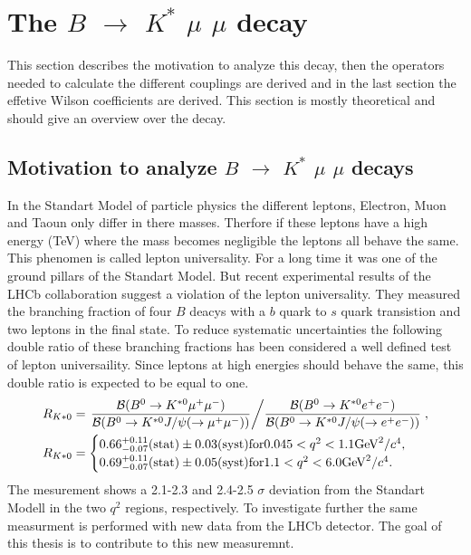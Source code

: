 \documentclass[english]{uzhpub}
\begin{document}
 \section{The $B$ $\rightarrow$ $K^{*}$ $\mu$ $\mu$ decay}

This section describes the motivation to analyze this decay, then the operators needed to calculate the different couplings are derived and in the last section the effetive Wilson coefficients are derived. This section is mostly theoretical and should give an overview over the decay.

 \subsection{Motivation to analyze $B$ $\rightarrow$ $K^{*}$ $\mu$ $\mu$ decays} \label{sec:Motivation}

 In the Standart Model of particle physics the different leptons, Electron, Muon and Taoun only differ in there masses. Therfore if these leptons have a high energy (TeV) where the mass becomes negligible the leptons all behave the same. This phenomen is called lepton universality. For a long time it was one of the ground pillars of the Standart Model. But recent experimental results of the LHCb collaboration \cite{bib:LU} suggest a violation of the lepton universality. They measured the branching fraction of four $B$ deacys with a $b$ quark to $s$ quark transistion and two leptons in the final state. To reduce systematic uncertainties the following double ratio of these branching fractions has been considered a well defined test of lepton universaility. Since leptons at high energies should behave the same, this double ratio is expected to be equal to one.
 \begin{equation}
   \begin{split}
   R_{K*0} &= \left. \dfrac{\mathcal{B}(B^0 \rightarrow K^{*0} \mu^+ \mu^-)}{\mathcal{B}(B^0 \rightarrow K^{*0} J/\psi(\rightarrow \mu^+ \mu^-))} \middle/   \dfrac{\mathcal{B}(B^0 \rightarrow K^{*0} e^+ e^-)}{\mathcal{B} ( B^0 \rightarrow K^{*0} J/\psi(\rightarrow e^+ e^-))}  \right. , \\
   R_{K*0} &=   \begin{cases}
     0.66^{+0.11}_{-0.07} (\text{stat}) \pm 0.03 (\text{syst}) \text{for} 0.045 < q^2 < 1.1 \text{GeV}^2/c^4, \\
     0.69^{+0.11}_{-0.07} (\text{stat}) \pm 0.05 (\text{syst}) \text{for} 1.1 < q^2 < 6.0 \text{GeV}^2/c^4.
 \end{cases}
 \end{split}
 \end{equation}
 The mesurement shows a 2.1-2.3 and 2.4-2.5 $\sigma$ deviation from the Standart Modell in the two $q^2$ regions, respectively.
 To investigate further the same measurment is performed with new data from the LHCb detector. The goal of this thesis is to contribute to this new measuremnt.
\end{document}
